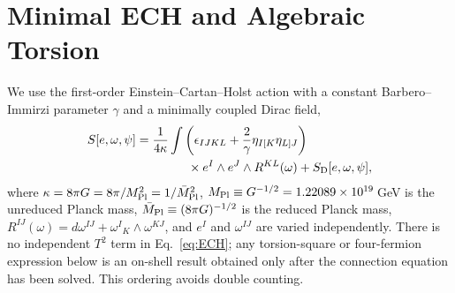 \documentclass[aps,prd,twocolumn,superscriptaddress,showpacs,preprintnumbers,nofootinbib,longbibliography,floatfix]{revtex4-2}
\newcommand{\MPl}{M_{\rm Pl}}
\newcommand{\fnl}{f_{\rm NL}}
\begin{document}

\section{Minimal ECH and Algebraic Torsion}\label{sec:theory}

We use the first-order Einstein--Cartan--Holst action with a constant
Barbero--Immirzi parameter $\gamma$ and a minimally coupled Dirac field,
\begin{align}\label{eq:ECH}
S[e,\omega,\psi] ={}& \frac{1}{4\kappa}\int
\left(\epsilon_{IJKL}+\frac{2}{\gamma}\eta_{I[K}\eta_{L]J}\right)\nonumber\\
&\hspace{1.0cm}\times e^I\wedge e^J\wedge R^{KL}(\omega)
+ S_{\rm D}[e,\omega,\psi],
\end{align}
where $\kappa=8\pi G=8\pi/M_{\rm Pl}^2=1/\bar M_{\rm Pl}^2$,
$M_{\rm Pl}\equiv G^{-1/2}=1.22089\times10^{19}\,$GeV is the unreduced Planck
mass, $\bar M_{\rm Pl}\equiv(8\pi G)^{-1/2}$ is the reduced Planck mass,
$R^{IJ}(\omega)=d\omega^{IJ}+\omega^I{}_K\wedge\omega^{KJ}$, and $e^I$ and
$\omega^{IJ}$ are varied independently.  There
is no independent $T^2$ term in Eq.~\eqref{eq:ECH}; any torsion-square or
four-fermion expression below is an on-shell result obtained only after the
connection equation has been solved.  This ordering avoids double counting.
\end{document}
